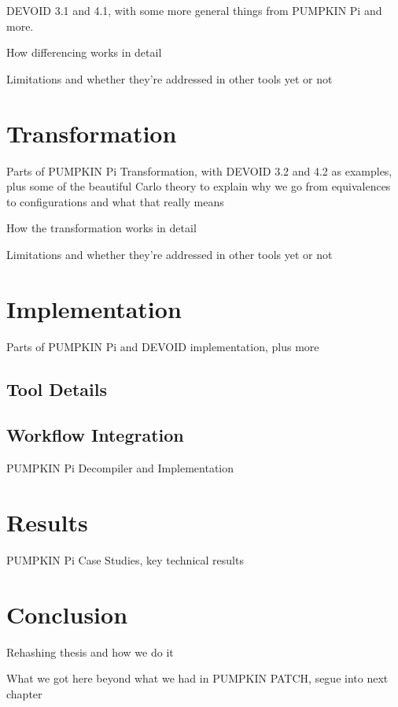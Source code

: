 DEVOID 3.1 and 4.1, with some more general things from PUMPKIN Pi and more.

How differencing works in detail

Limitations and whether they're addressed in other tools yet or not

\section{Transformation}

Parts of PUMPKIN Pi Transformation, with DEVOID 3.2 and 4.2 as examples, plus some of the beautiful Carlo theory to explain why we go from equivalences to configurations and what that really means

How the transformation works in detail

Limitations and whether they're addressed in other tools yet or not

\section{Implementation}

Parts of PUMPKIN Pi and DEVOID implementation, plus more

\subsection{Tool Details}

\subsection{Workflow Integration}

PUMPKIN Pi Decompiler and Implementation

\section{Results}

PUMPKIN Pi Case Studies, key technical results

\section{Conclusion}

Rehashing thesis and how we do it

What we got here beyond what we had in PUMPKIN PATCH, segue into next chapter


